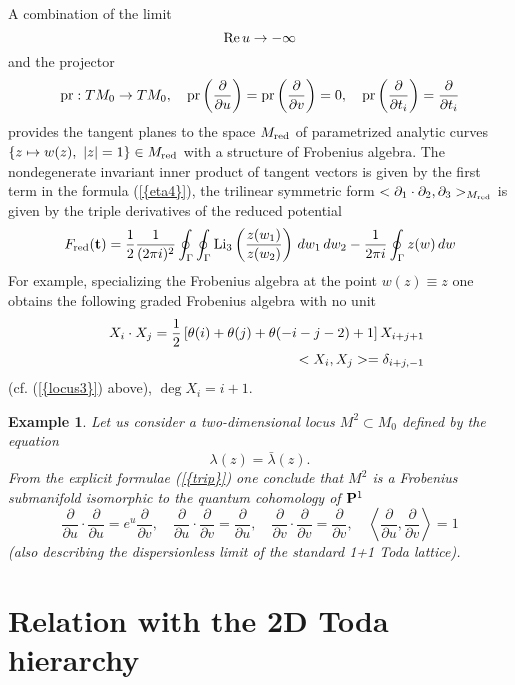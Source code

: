 \documentclass[numbook, envcountsame, envcountreset]{svjour3}
\newtheorem{exam}[theorem]{Example}
\begin{document}
\begin{remark} A combination of the limit
$$
{\rm Re} \, u\to -\infty
$$
and the projector
$$
{\rm pr}: TM_0\to TM_0, \quad {\rm pr}\left( \frac{\partial}{{\partial} u}\right) = {\rm pr}\left( \frac{\partial}{{\partial} v}\right)=0, \quad {\rm pr}\left( \frac{\partial}{{\partial} t_i}\right)=\frac{\partial}{{\partial} t_i}
$$
provides the tangent planes to the space $M_{\rm red}$ of parametrized analytic curves $\{ z\mapsto w(z), ~ |z|=1\}\in M_{\rm red}$ with a structure of Frobenius algebra. The nondegenerate invariant inner product of tangent vectors is given by the first term in the formula {(\ref{{eta4}})}, the trilinear symmetric form $<{\partial}_1\cdot {\partial}_2, {\partial}_3>_{M_{\rm red}}$ is given by the triple derivatives of the reduced potential
\begin{equation}\label{potred}
F_{\rm red}({\bf t}) =\frac12 \frac1{(2\pi i)^2}\oint_\Gamma\oint_\Gamma {\rm Li}_3 \left( \frac{z(w_1)}{z(w_2)}\right)\, dw_1\, dw_2 -\frac1{2\pi i} \oint_\Gamma  z(w)\, dw
\end{equation}
For example, specializing the Frobenius algebra at the point $w(z)\equiv z$ one obtains the following graded Frobenius algebra with no unit
\begin{eqnarray}\label{red1}
&&
X_i \cdot X_j = \frac12\left[ \theta(i)+\theta(j)+\theta(-i-j-2)+1\right]  X_{i+j+1}
\\
&&
< X_i, X_j> =\delta_{i+j, -1}
{\nonumber}
\end{eqnarray}
(cf. {(\ref{{locus3}})} above), $\deg X_i =i+1$.
\end{remark}

\begin{exam}\label{ex215} Let us consider a two-dimensional locus
$M^2\subset M_0$ defined by the equation
$$
\lambda(z) =\bar\lambda(z).
$$
From the explicit formulae {(\ref{{trip}})} one conclude that $M^2$ is a Frobenius submanifold isomorphic to the quantum cohomology of ${\bf P}^1$
$$
\frac{\partial}{{\partial} u}\cdot \frac{\partial}{{\partial} u}= e^u \frac{\partial}{{\partial} v}, \quad \frac{\partial}{{\partial} u}\cdot \frac{\partial}{{\partial} v}=\frac{\partial}{{\partial} u}, \quad \frac{\partial}{{\partial} v}\cdot \frac{\partial}{{\partial} v}=\frac{\partial}{{\partial} v}, \quad \left\langle \frac{\partial}{{\partial} u}, \frac{\partial}{{\partial} v}\right\rangle=1
$$
(also describing the dispersionless limit of the standard 1+1 Toda lattice).
\end{exam}

\section{Relation with the 2D Toda hierarchy}\label{sec3}\par
\end{document}
